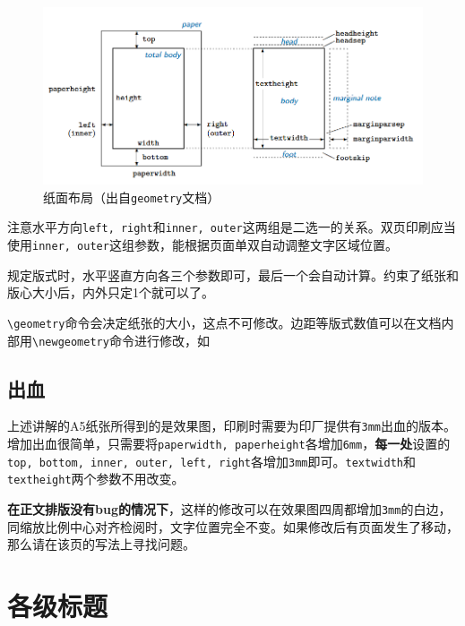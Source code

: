 \documentclass[10pt,openany]{book}
\begin{document}
\begin{sloppypar}
    \begin{figure}[H]
        \centering
        \includegraphics[width=\linewidth]{data/paper.png}
        \caption{纸面布局（出自\texttt{geometry}文档）}
    \end{figure}

    注意水平方向\texttt{left,\ right}和\texttt{inner,\ outer}这两组是二选一的关系。双页印刷应当使用\texttt{inner,\ outer}这组参数，能根据页面单双自动调整文字区域位置。

    

    规定版式时，水平竖直方向各三个参数即可，最后一个会自动计算。约束了纸张和版心大小后，内外只定1个就可以了。

    \texttt{\textbackslash{}geometry}命令会决定纸张的大小，这点不可修改。边距等版式数值可以在文档内部用\texttt{\textbackslash{}newgeometry}命令进行修改，如

    

    \subsection{出血}

    上述讲解的A5纸张所得到的是效果图，印刷时需要为印厂提供有\texttt{3mm}出血的版本。增加出血很简单，只需要将\texttt{paperwidth,\ paperheight}各增加\texttt{6mm}，\textbf{每一处}设置的\texttt{top,\ bottom,\ inner,\ outer,\ left,\ right}各增加\texttt{3mm}即可。\texttt{textwidth}和\texttt{textheight}两个参数不用改变。

    \textbf{在正文排版没有bug的情况下}，这样的修改可以在效果图四周都增加\texttt{3mm}的白边，同缩放比例中心对齐检阅时，文字位置完全不变。如果修改后有页面发生了移动，那么请在该页的写法上寻找问题。

    \section{各级标题}
    \label{title}


\end{sloppypar}
\end{document}
